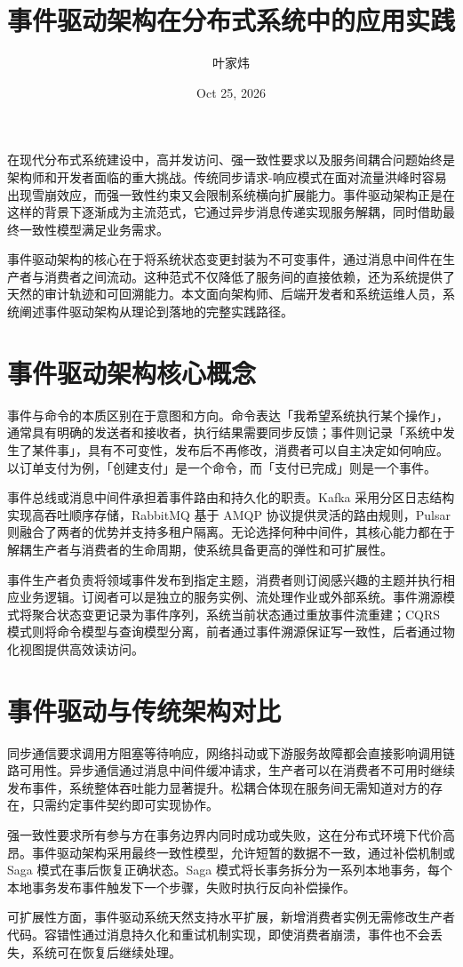 \title{事件驱动架构在分布式系统中的应用实践}
\author{叶家炜}
\date{Oct 25, 2026}
\maketitle
在现代分布式系统建设中，高并发访问、强一致性要求以及服务间耦合问题始终是架构师和开发者面临的重大挑战。传统同步请求-响应模式在面对流量洪峰时容易出现雪崩效应，而强一致性约束又会限制系统横向扩展能力。事件驱动架构正是在这样的背景下逐渐成为主流范式，它通过异步消息传递实现服务解耦，同时借助最终一致性模型满足业务需求。\par
事件驱动架构的核心在于将系统状态变更封装为不可变事件，通过消息中间件在生产者与消费者之间流动。这种范式不仅降低了服务间的直接依赖，还为系统提供了天然的审计轨迹和可回溯能力。本文面向架构师、后端开发者和系统运维人员，系统阐述事件驱动架构从理论到落地的完整实践路径。\par
\chapter{事件驱动架构核心概念}
事件与命令的本质区别在于意图和方向。命令表达「我希望系统执行某个操作」，通常具有明确的发送者和接收者，执行结果需要同步反馈；事件则记录「系统中发生了某件事」，具有不可变性，发布后不再修改，消费者可以自主决定如何响应。以订单支付为例，「创建支付」是一个命令，而「支付已完成」则是一个事件。\par
事件总线或消息中间件承担着事件路由和持久化的职责。Kafka 采用分区日志结构实现高吞吐顺序存储，RabbitMQ 基于 AMQP 协议提供灵活的路由规则，Pulsar 则融合了两者的优势并支持多租户隔离。无论选择何种中间件，其核心能力都在于解耦生产者与消费者的生命周期，使系统具备更高的弹性和可扩展性。\par
事件生产者负责将领域事件发布到指定主题，消费者则订阅感兴趣的主题并执行相应业务逻辑。订阅者可以是独立的服务实例、流处理作业或外部系统。事件溯源模式将聚合状态变更记录为事件序列，系统当前状态通过重放事件流重建；CQRS 模式则将命令模型与查询模型分离，前者通过事件溯源保证写一致性，后者通过物化视图提供高效读访问。\par
\chapter{事件驱动与传统架构对比}
同步通信要求调用方阻塞等待响应，网络抖动或下游服务故障都会直接影响调用链路可用性。异步通信通过消息中间件缓冲请求，生产者可以在消费者不可用时继续发布事件，系统整体吞吐能力显著提升。松耦合体现在服务间无需知道对方的存在，只需约定事件契约即可实现协作。\par
强一致性要求所有参与方在事务边界内同时成功或失败，这在分布式环境下代价高昂。事件驱动架构采用最终一致性模型，允许短暂的数据不一致，通过补偿机制或 Saga 模式在事后恢复正确状态。Saga 模式将长事务拆分为一系列本地事务，每个本地事务发布事件触发下一个步骤，失败时执行反向补偿操作。\par
可扩展性方面，事件驱动系统天然支持水平扩展，新增消费者实例无需修改生产者代码。容错性通过消息持久化和重试机制实现，即使消费者崩溃，事件也不会丢失，系统可在恢复后继续处理。\par
